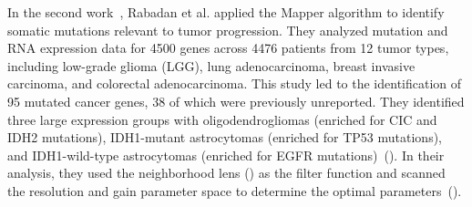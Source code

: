 In the second work~\cite{rabadan2020identification}, Rabadan et al. applied the Mapper algorithm to identify somatic mutations relevant to tumor progression. They analyzed mutation and RNA expression data for 4500 genes across 4476 patients from 12 tumor types, including low-grade glioma (LGG), lung adenocarcinoma, breast invasive carcinoma, and colorectal adenocarcinoma. This study led to the identification of 95 mutated cancer genes, 38 of which were previously unreported. They identified three large expression groups with oligodendrogliomas (enriched for CIC and IDH2 mutations), IDH1-mutant astrocytomas (enriched for TP53 mutations), and IDH1-wild-type astrocytomas (enriched for EGFR mutations)~(). In their analysis, they used the neighborhood lens () as the filter function and scanned the resolution and gain parameter space to determine the optimal parameters~().  










